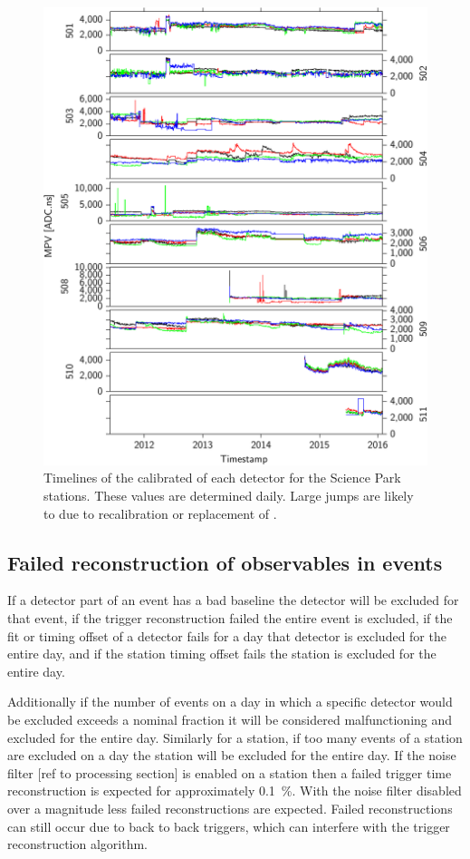 \begin{figure}
    \centering
    \includegraphics[width=0.7\linewidth]{plots/dataset/mpv.pdf}
    \caption{Timelines of the calibrated \mpv of each detector for the Science Park stations. These values are determined daily. Large jumps are likely to due to recalibration or replacement of \pmts.}
    \label{fig:mpv}
\end{figure}


\subsection{Failed reconstruction of observables in events}

If a detector part of an event has a bad baseline the detector will be excluded for that event, if the trigger reconstruction failed the entire event is excluded, if the \mpv fit or timing offset of a detector fails for a day that detector is excluded for the entire day, and if the station timing offset fails the station is excluded for the entire day.

Additionally if the number of events on a day in which a specific detector would be excluded exceeds a nominal fraction it will be considered malfunctioning and excluded for the entire day. Similarly for a station, if too many events of a station are excluded on a day the station will be excluded for the entire day. If the noise filter [ref to processing section] is enabled on a station then a failed trigger time reconstruction is expected for approximately \SI{0.1}{\percent}. With the noise filter disabled over a magnitude less failed reconstructions are expected. Failed reconstructions can still occur due to back to back triggers, which can interfere with the trigger reconstruction algorithm.

